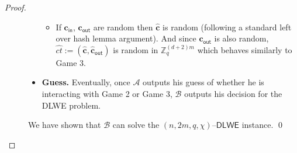 \documentclass[runningheads,10pt]{llncs}
\begin{document}
\begin{proof}
\begin{description}
\begin{itemize}
\begin{itemize}
				\item If $\textbf{c}_{\textsf{in}}$, $ \textbf{c}_{\textsf{out}}$ are random then $\widehat{\textbf{c}}$ is random (following a standard left over hash lemma argument). And since $\widehat{\textbf{c}}_{\textsf{out}}$ is also random, $\widehat{ct}:=(\widehat{\textbf{c}}, \widehat{\textbf{c}}_{\textsf{out}})$ is random in $\mathbb{Z}_q^{(d+2)m}$ which behaves similarly to Game 3.
			\end{itemize}
			\item \textbf{Guess.} Eventually, once $\mathcal{A}$ outputs his guess of whether he is interacting with Game 2 or Game 3, $\mathcal{B}$ outputs his decision for the DLWE problem.  
			
		\end{itemize}
		We have shown that $\mathcal{B}$ can solve the $(n,2m,q,\chi)$--$\textsf{DLWE}$ instance. \qed
		
	\end{description}
\fi 
\end{proof}
\end{document}
